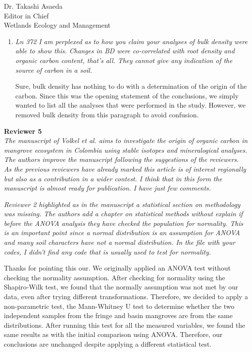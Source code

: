 \documentclass[11pt]{bgcletter}
\begin{document}
\begin{letter}{Dr. Takashi Asaeda\\
 Editor in Chief \\ Wetlands Ecology and Management}
\begin{enumerate}
{\color{blue} The sentence was completed to make the contrast clear as suggested.}

\item {\it Ln 372 I am perplexed as to how you claim your analyses of bulk density were able to show this. Changes in BD were co-correlated with root density and organic carbon content, that's all. They cannot give any indication of the source of carbon in a soil.}

{\color{blue} Sure, bulk density has nothing to do with a determination of the origin of the carbon. Since this was the opening statement of the conclusions, we simply wanted to list all the analyses that were performed in the study. However, we removed bulk density from this paragraph to avoid confusion.}

\end{enumerate}

\newpage
{\bf Reviewer 5} \\

{\it The manuscript of Volkel et al. aims to investigate the origin of organic carbon in mangrove ecosystem in Colombia using stable isotopes and mineralogical analyses. The authors improve the manuscript following the suggestions of the reviewers. As the previous reviewers have already marked this article is of interest regionally but also as a contribution in a wider contest. I think that in this form the manuscript is almost ready for publication. I have just few comments.}

{\it Reviewer 2 highlighted as in the manuscript a statistical section on methodology was missing. The authors add a chapter on statistical methods without explain if before the ANOVA analysis they have checked the population for normality. This is an important point since a normal distribution is an assumption for ANOVA and many soil characters have not a normal distribution. In the file with your codes, I didn't find any code that is usually used to test for normality.}

{\color{blue} Thanks for pointing this our. We originally applied an ANOVA test without checking the normality assumption. After checking for normality using the Shapiro-Wilk test, we found that the normally assumption was not met by our data, even after trying different transformations. Therefore, we decided to apply a non-parametric test, the Mann-Whitney U test to determine whether the two independent samples from the fringe and basin mangroves are from the same distributions. After running this test for all the measured variables, we found the same results as with the initial comparison using ANOVA. Therefore, our conclusions are unchanged despite applying a different statistical test. }


\end{letter}
\end{document}
